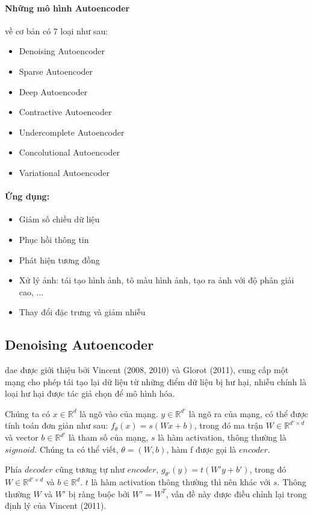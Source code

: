 \paragraph{Những mô hình Autoencoder} về cơ bản có 7 loại như sau: \cite{autoencoder_type}
\begin{itemize}
	\item Denoising Autoencoder
	\item Sparse Autoencoder
	\item Deep Autoencoder
	\item Contractive Autoencoder
	\item Undercomplete Autoencoder
	\item Concolutional Autoencoder
	\item Variational Autoencoder
\end{itemize}
\paragraph{Ứng dụng:} \cite{Autoencoder_apps}
\begin{itemize}
	\item Giảm số chiều dữ liệu 
	\item Phục hồi thông tin
	\item Phát hiện tương đồng
	\item Xử lý ảnh: tái tạo hình ảnh, tô màu hình ảnh, tạo ra ảnh với độ phân giải cao, ...
	\item Thay đổi đặc trưng và giảm nhiễu
\end{itemize}
\subsection{Denoising Autoencoder}
\ac{dae} được giới thiệu bởi Vincent (2008, 2010) và Glorot (2011), cung cấp một mạng cho phép tái tạo lại dữ liệu từ những điểm dữ liệu bị hư hại, nhiễu chính là loại hư hại được tác giả chọn để mô hình hóa. 

Chúng ta có $x \in \mathbb{R}^d$ là ngõ vào của mạng. $y \in \mathbb{R}^{d'}$ là ngõ ra của mạng, có thể được tính toán đơn giản như sau: $f_{\theta} (x) = s (Wx + b)$, trong đó ma trận $W \in \mathbb{R}^{d' \times d}$ và vector $b \in \mathbb{R}^{d'}$ là tham số của mạng, $s$ là hàm activation, thông thường là $sigmoid$. Chúng ta có thể viết, $\theta  = (W, b)$, hàm f được gọi là $encoder$.

Phía $decoder$ cũng tương tự như $encoder$, $g_{\theta'} (y) = t(W'y + b')$, trong đó $W \in \mathbb{R}^{d' \times d}$ và $b \in \mathbb{R}^d$. $t$ là hàm activation thông thường thì nên khác với $s$. Thông thường $W$ và $W'$ bị ràng buộc bởi $W' = W^T$, vấn đề này được điều chỉnh lại trong định lý của Vincent (2011).

